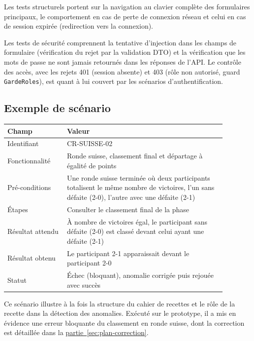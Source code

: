 Les tests structurels portent sur la navigation au clavier complète des formulaires principaux, le comportement en cas de perte de connexion réseau et celui en cas de session expirée (redirection vers la connexion).

Les tests de sécurité comprennent la tentative d'injection dans les champs de formulaire (vérification du rejet par la validation DTO) et la vérification que les mots de passe ne sont jamais retournés dans les réponses de l'API. Le contrôle des accès, avec les rejets 401 (session absente) et 403 (rôle non autorisé, guard \texttt{GardeRoles}), est quant à lui couvert par les scénarios d'authentification.

\subsection{Exemple de scénario}
\begin{table}[H]
    \centering
    \small
    \renewcommand{\arraystretch}{1.4}
    \begin{tabular}{|>{\raggedright\arraybackslash}p{0.24\linewidth}|>{\raggedright\arraybackslash}p{0.64\linewidth}|}
        \hline
        \textbf{Champ} & \textbf{Valeur} \\
        \hline
        Identifiant & CR-SUISSE-02 \\
        \hline
        Fonctionnalité & Ronde suisse, classement final et départage à égalité de points \\
        \hline
        Pré-conditions & Une ronde suisse terminée où deux participants totalisent le même nombre de victoires, l'un sans défaite (2-0), l'autre avec une défaite (2-1) \\
        \hline
        Étapes & Consulter le classement final de la phase \\
        \hline
        Résultat attendu & À nombre de victoires égal, le participant sans défaite (2-0) est classé devant celui ayant une défaite (2-1) \\
        \hline
        Résultat obtenu & Le participant 2-1 apparaissait devant le participant 2-0 \\
        \hline
        Statut & Échec (bloquant), anomalie corrigée puis rejouée avec succès \\
        \hline
    \end{tabular}
\end{table}

Ce scénario illustre à la fois la structure du cahier de recettes et le rôle de la recette dans la détection des anomalies. Exécuté sur le prototype, il a mis en évidence une erreur bloquante du classement en ronde suisse, dont la correction est détaillée dans la \hyperref[sec:plan-correction]{partie~\ref*{sec:plan-correction}}.

